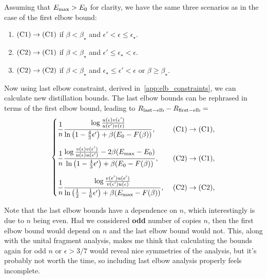 Assuming that $E_{\rm{max}} > E_0$ for clarity, we have the same three scenarios as in the case of the first elbow bound:
\begin{enumerate}
	\item $\rm{(C1)} \rightarrow \rm{(C1)}$ if $\beta < \beta_{\star}$ and $\epsilon' < \epsilon  \leq \epsilon_{\star}$.
	\item $\rm{(C2)} \rightarrow \rm{(C1)}$ if $\beta < \beta_{\star}$ and $\epsilon' \leq \epsilon_{\star} < \epsilon$.
	\item $\rm{(C2)} \rightarrow \rm{(C2)}$ if $\beta < \beta_{\star}$ and $\epsilon_{\star} \leq \epsilon' < \epsilon$ or $\beta \geq \beta_{\star}$.
\end{enumerate}
Now using last elbow constraint, derived in~\cref{app:elb_constraints}, we can calculate new distillation bounds.
The last elbow bounds can be rephrased in terms of the first elbow bound, leading to $R_{\rm{last-elb}} - R_{\rm{first-elb}} = $
\begin{equation}\label{eq:last_elb_coords}
	\begin{cases}
		\dfrac{1}{n} \dfrac{\log{\frac{u(\epsilon)v(\epsilon')}{u(\epsilon')v(\epsilon)}}}{\ln{\big( 1-\frac{4}{3}\epsilon' \big)} + \beta (E_0 - F(\beta))},\ &\rm{(C1)} \rightarrow \rm{(C1)}, \vspace{10pt}\\
		\dfrac{1}{n} \dfrac{\log{\frac{v(\epsilon)v(\epsilon')}{u(\epsilon)u(\epsilon')}} - 2\beta(E_{\rm{max}} - E_0)}{\ln{\big( 1-\frac{4}{3}\epsilon' \big)} + \beta (E_0 - F(\beta))},\ &\rm{(C2)} \rightarrow \rm{(C1)}, \vspace{10pt}\\
		\dfrac{1}{n} \dfrac{\log{\frac{v(\epsilon')u(\epsilon')}{v(\epsilon')u(\epsilon)}}}{\ln{\big( \frac{1}{2}-\frac{1}{6}\epsilon' \big)} + \beta (E_{\rm{max}} - F(\beta))},\ &\rm{(C2)} \rightarrow \rm{(C2)}, 
	\end{cases}
\end{equation}

Note that the last elbow bounds have a dependence on $n$, which interestingly is due to $n$ being even.
Had we considered \textbf{odd} number of copies $n$, then the first elbow bound would depend on $n$ and the last elbow bound would not.
This, along with the unital fragment analysis, makes me think that calculating the bounds again for odd $n$ or $\epsilon > 3/7$ would reveal nice symmetries of the analysis, but it's probably not worth the time, so including last elbow analysis properly feels incomplete.


